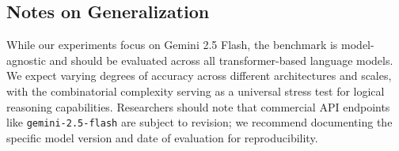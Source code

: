 \documentclass[11pt,a4paper]{article}
\begin{document}
\subsection*{Notes on Generalization}
While our experiments focus on Gemini 2.5 Flash, the benchmark is model-agnostic and should be evaluated across all transformer-based language models. We expect varying degrees of accuracy across different architectures and scales, with the combinatorial complexity serving as a universal stress test for logical reasoning capabilities. Researchers should note that commercial API endpoints like \texttt{gemini-2.5-flash} are subject to revision; we recommend documenting the specific model version and date of evaluation for reproducibility.




\end{document}

